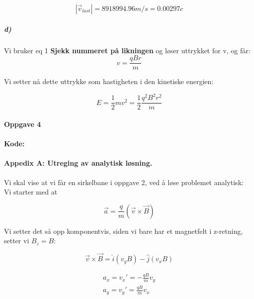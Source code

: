 \documentclass[a4paper,norsk, 10pt]{article}
\begin{document}
$$
|\vec{v}_{last}| = 8918994.96 m/s = 0.00297 c
$$

\subparagraph*{d)}

Vi bruker eq 1 \textbf{Sjekk nummeret på likningen} og løser uttrykket for v, og får:
\begin{equation}
v = \frac{qBr}{m} 
\end{equation}

Vi setter nå dette uttrykke som hastigheten i den kinetiske energien:

\begin{equation}
E = \frac{1}{2}mv^2 = \frac{1}{2} \frac{q^2B^2r^2}{m}
\end{equation}

\paragraph*{Oppgave 4}

\paragraph*{Kode:}
\hspace{5mm}




\paragraph*{Appedix A: Utreging av analytisk løsning.}
\hspace{5mm}

Vi skal vise at vi får en sirkelbane i oppgave 2, ved å løse problemet analytisk:\\

Vi starter med at

\begin{equation}
\vec{a} = \frac{q}{m}(\vec{v} \times \vec{B})
\end{equation}

Vi setter det så opp komponentvis, siden vi bare har et magnetfelt i z-retning, setter vi $B_z = B$:

$$
\vec{v} \times \vec{B} = \hat{i}(v_yB) - \hat{j}(v_xB)
$$

\begin{equation}
\begin{split}
a_x = v_x' = - \frac{qB}{m}v_y
\\
a_y = v_y' =  \frac{qB}{m}v_x
\end{split}
\end{equation}
\end{document}
